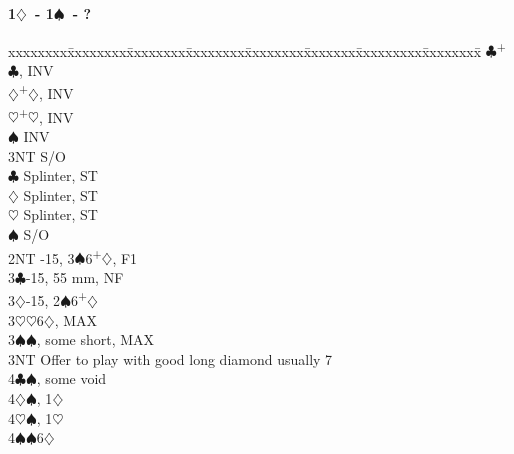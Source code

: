 \documentclass[10pt]{article}
\renewcommand{\c}{$\clubsuit$}
\renewcommand{\d}{$\diamondsuit$}
\newcommand{\h}{$\heartsuit$}
\newcommand{\s}{$\spadesuit$}
\newcommand{\p}{\textsuperscript{+}}
\newcommand{\m}{\textsuperscript{\textminus}}
\newenvironment{bidtable}[1][]
{\textbf{#1}
  \begin{adjustwidth}{1em}{}
    \addvspace{2pt}
    \begin{tabbing}
      xxxxxxxx\=xxxxxxxx\=xxxxxxxx\=xxxxxxxx\=xxxxxxxx\=xxxxxxx\=xxxxxxxxx\=xxxxxxxx\=\kill}
{\end{tabbing}\end{adjustwidth}\bigskip}%
\begin{document}
\begin{bidtable}[1\d\ - 1\s\ - ?]
     \c  {}\p\c, INV                                           \\
     \d  {}\p\d, INV                                           \\
     \h  {}\p\h, INV                                           \\
     \s  \> INV                                                  \\
     \> 3NT  \> S/O                                                  \\
     \c  \> Splinter, ST                                         \\
     \d  \> Splinter, ST                                         \\
     \h  \> Splinter, ST                                         \\
     \s  \> S/O                                                  \\
2NT  -15, 3\s 6\p\d, F1                                         \\
3\c  {}-15, 55 mm, NF                                             \\
3\d  {}-15, 2\m\s 6\p\d                                           \\
3\h  {}\h 6\d, MAX                                                 \\
3\s  {}\s, some short, MAX                                         \\
3NT  \> Offer to play with good long diamond usually 7               \\
4\c  {}\s, some void                                               \\
4\d  {}\s, 1\d                                                     \\
4\h  {}\s, 1\h                                                     \\
4\s  {}\s 6\d
\end{bidtable}
\end{document}
